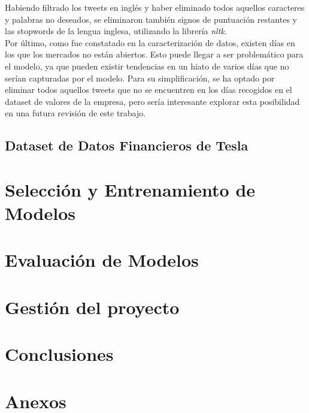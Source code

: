 \documentclass[a4paper, 12pt]{report}
\begin{document}
                        Habiendo filtrado los tweets en inglés y haber eliminado todos aquellos caracteres y palabras no deseados, se eliminaron también signos de puntuación restantes 
                        y las stopwords de la lengua inglesa, utilizando la librería \textit{nltk}.\\

                        Por último, como fue constatado en la caracterización de datos, existen días en los que los mercados no están abiertos.
                        Esto puede llegar a ser problemático para el modelo, ya que pueden existir tendencias en un hiato de varios días que no serían capturadas por el modelo. Para su simplificación,
                        se ha optado por eliminar todos aquellos tweets que no se encuentren en los días recogidos en el dataset de valores de la empresa, pero
                        sería interesante explorar esta posibilidad en una futura revisión de este trabajo.\\

                \section{Dataset de Datos Financieros de Tesla}

                        
                        

                        

    \chapter{Selección y Entrenamiento de Modelos}
    \chapter{Evaluación de Modelos}
    \chapter{Gestión del proyecto}
    \chapter{Conclusiones}
    
        
    \chapter{Anexos}
\end{document}
